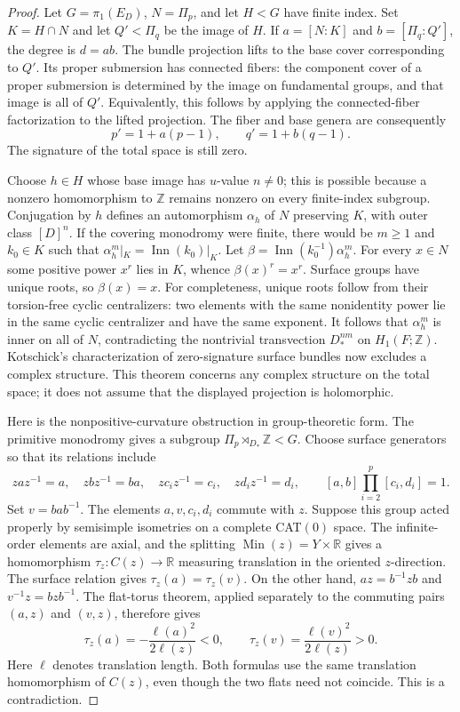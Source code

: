 \begin{proof}
Let $G=\pi_1(E_D)$, $N=\Pi_p$, and let $H<G$ have finite index.
Set $K=H\cap N$ and let $Q'<\Pi_q$ be the image of $H$.  If
$a=[N:K]$ and $b=[\Pi_q:Q']$, the degree is $d=ab$.  The bundle
projection lifts to the base cover corresponding to $Q'$.  Its
proper submersion has connected fibers: the component cover of a
proper submersion is determined by the image on fundamental groups,
and that image is all of $Q'$.  Equivalently, this follows by applying
the connected-fiber factorization to the lifted projection.  The
fiber and base genera are consequently
\begin{equation}\label{eq:fixed-bundle-cover-genera}
 p'=1+a(p-1),\qquad q'=1+b(q-1).
\end{equation}
The signature of the total space is still zero.

Choose $h\in H$ whose base image has $u$-value $n\ne0$; this is
possible because a nonzero homomorphism to $\mathbb Z$ remains
nonzero on every finite-index subgroup.  Conjugation by $h$ defines
an automorphism $\alpha_h$ of $N$ preserving $K$, with outer class
$[D]^n$.  If the covering monodromy were finite, there would be
$m\ge1$ and $k_0\in K$ such that
$\alpha_h^m|_K=\operatorname{Inn}(k_0)|_K$.
Let $\beta=\operatorname{Inn}(k_0^{-1})\alpha_h^m$.
For every $x\in N$ some positive power $x^r$ lies in $K$, whence
$\beta(x)^r=x^r$.  Surface groups have unique roots, so $\beta(x)=x$.
For completeness, unique roots follow from their torsion-free cyclic
centralizers: two elements with the same nonidentity power lie in
the same cyclic centralizer and have the same exponent.  It follows
that $\alpha_h^m$ is inner on all of $N$, contradicting the nontrivial
transvection $D_*^{nm}$ on $H_1(F;\mathbb Z)$.
Kotschick's characterization of zero-signature surface bundles
\cite[Theorem 4]{KotschickFibered} now excludes a complex structure.
This theorem concerns any complex structure on the total space; it
does not assume that the displayed projection is holomorphic.

Here is the nonpositive-curvature obstruction in group-theoretic
form.  The primitive monodromy gives a subgroup
$\Pi_p\rtimes_{D_*}\mathbb Z<G$.  Choose surface generators so
that its relations include
\[
 zaz^{-1}=a,\quad zbz^{-1}=ba,\quad
 zc_iz^{-1}=c_i,\quad zd_iz^{-1}=d_i,\qquad
 [a,b]\prod_{i=2}^p[c_i,d_i]=1.
\]
Set $v=bab^{-1}$.  The elements $a,v,c_i,d_i$ commute with $z$.
Suppose this group acted properly by semisimple isometries on a
complete CAT$(0)$ space.  The infinite-order elements are axial,
and the splitting
$\operatorname{Min}(z)=Y\times\mathbb R$ gives a homomorphism
$\tau_z:C(z)\to\mathbb R$ measuring translation in the oriented
$z$-direction.  The surface relation gives
$\tau_z(a)=\tau_z(v)$.
On the other hand, $az=b^{-1}zb$ and $v^{-1}z=bzb^{-1}$.
The flat-torus theorem, applied separately to the commuting pairs
$(a,z)$ and $(v,z)$, therefore gives
\[
 \tau_z(a)=-\frac{\ell(a)^2}{2\ell(z)}<0,\qquad
 \tau_z(v)=\frac{\ell(v)^2}{2\ell(z)}>0.
\]
Here $\ell$ denotes translation length.  Both formulas use the same
translation homomorphism of $C(z)$, even though the two flats need
not coincide.  This is a contradiction.


\end{proof}
